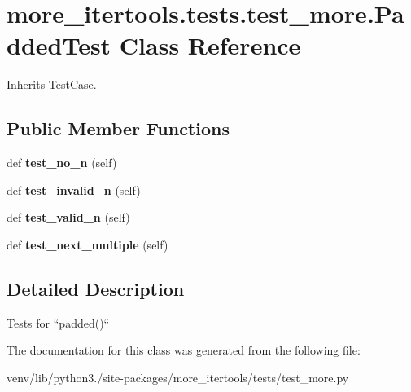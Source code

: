 \hypertarget{classmore__itertools_1_1tests_1_1test__more_1_1_padded_test}{}\section{more\+\_\+itertools.\+tests.\+test\+\_\+more.\+Padded\+Test Class Reference}
\label{classmore__itertools_1_1tests_1_1test__more_1_1_padded_test}


Inherits Test\+Case.

\subsection*{Public Member Functions}
\begin{DoxyCompactItemize}
\item 
\mbox{\label{classmore__itertools_1_1tests_1_1test__more_1_1_padded_test_a28c94e96fcb19ed93492d86724ecf3a3}} 
def {\bfseries test\+\_\+no\+\_\+n} (self)
\item 
\mbox{\label{classmore__itertools_1_1tests_1_1test__more_1_1_padded_test_a7e2da2354dca1987878de60f779b6002}} 
def {\bfseries test\+\_\+invalid\+\_\+n} (self)
\item 
\mbox{\label{classmore__itertools_1_1tests_1_1test__more_1_1_padded_test_a5266dd4e7278d61fcd9f4fb7cdc72ae1}} 
def {\bfseries test\+\_\+valid\+\_\+n} (self)
\item 
\mbox{\label{classmore__itertools_1_1tests_1_1test__more_1_1_padded_test_a3ff3b901967bb6d1194a33baf6ebb22d}} 
def {\bfseries test\+\_\+next\+\_\+multiple} (self)
\end{DoxyCompactItemize}


\subsection{Detailed Description}
\begin{DoxyVerb}Tests for ``padded()``\end{DoxyVerb}
 

The documentation for this class was generated from the following file\+:\begin{DoxyCompactItemize}
\item 
venv/lib/python3./site-\/packages/more\+\_\+itertools/tests/test\+\_\+more.\+py\end{DoxyCompactItemize}
